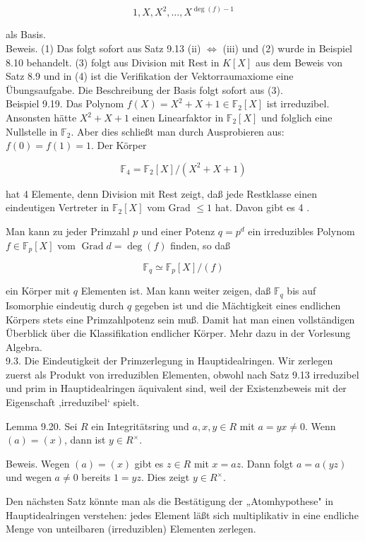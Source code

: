 \documentclass[10pt, letterpaper]{article}
\begin{document}
$$
1, X, X^{2}, \ldots, X^{\operatorname{deg}(f)-1}
$$

als Basis.\\
Beweis. (1) Das folgt sofort aus Satz 9.13 (ii) $\Longleftrightarrow$ (iii) und (2) wurde in Beispiel 8.10 behandelt. (3) folgt aus Division mit Rest in $K[X]$ aus dem Beweis von Satz 8.9 und in (4) ist die Verifikation der Vektorraumaxiome eine Übungsaufgabe. Die Beschreibung der Basis folgt sofort aus (3).\\
Beispiel 9.19. Das Polynom $f(X)=X^{2}+X+1 \in \mathbb{F}_{2}[X]$ ist irreduzibel. Ansonsten hätte $X^{2}+X+1$ einen Linearfaktor in $\mathbb{F}_{2}[X]$ und folglich eine Nullstelle in $\mathbb{F}_{2}$. Aber dies schließt man durch Ausprobieren aus: $f(0)=f(1)=1$. Der Körper

$$
\mathbb{F}_{4}=\mathbb{F}_{2}[X] /\left(X^{2}+X+1\right)
$$

hat 4 Elemente, denn Division mit Rest zeigt, daß jede Restklasse einen eindeutigen Vertreter in $\mathbb{F}_{2}[X]$ vom Grad $\leq 1$ hat. Davon gibt es 4 .

Man kann zu jeder Primzahl $p$ und einer Potenz $q=p^{d}$ ein irreduzibles Polynom $f \in \mathbb{F}_{p}[X]$ vom $\operatorname{Grad} d=\operatorname{deg}(f)$ finden, so daß

$$
\mathbb{F}_{q} \simeq \mathbb{F}_{p}[X] /(f)
$$

ein Körper mit $q$ Elementen ist. Man kann weiter zeigen, daß $\mathbb{F}_{q}$ bis auf Isomorphie eindeutig durch $q$ gegeben ist und die Mächtigkeit eines endlichen Körpers stets eine Primzahlpotenz sein muß. Damit hat man einen vollständigen Überblick über die Klassifikation endlicher Körper. Mehr dazu in der Vorlesung Algebra.\\
9.3. Die Eindeutigkeit der Primzerlegung in Hauptidealringen. Wir zerlegen zuerst als Produkt von irreduziblen Elementen, obwohl nach Satz 9.13 irreduzibel und prim in Hauptidealringen äquivalent sind, weil der Existenzbeweis mit der Eigenschaft ,irreduzibel‘ spielt.

Lemma 9.20. Sei $R$ ein Integritätsring und $a, x, y \in R$ mit $a=y x \neq 0$. Wenn $(a)=(x)$, dann ist $y \in R^{\times}$.

Beweis. Wegen $(a)=(x)$ gibt es $z \in R$ mit $x=a z$. Dann folgt $a=a(y z)$ und wegen $a \neq 0$ bereits $1=y z$. Dies zeigt $y \in R^{\times}$.

Den nächsten Satz könnte man als die Bestätigung der „Atomhypothese" in Hauptidealringen verstehen: jedes Element läßt sich multiplikativ in eine endliche Menge von unteilbaren (irreduziblen) Elementen zerlegen.
\end{document}
